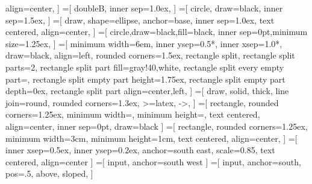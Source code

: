 	align=center,%
]%
=[%
	doubleB,%
	inner sep=1.0ex,%
]%
=[%
	circle,%
	draw=black,%
	inner sep=1.5ex,%
]%
=[%
	draw,%
	shape=ellipse,%
	anchor=base,%
	inner sep=1.0ex,%
	text centered,%
	align=center,%
]%
=[%
    circle,draw=black,fill=black,%
    inner sep=0pt,minimum size=1.25ex,%
]%
=[%
    minimum width=6em,%
    inner ysep=0.5*\inndist,%
    inner xsep=1.0*\inndist,%
    draw=black,%
    align=left,%
    rounded corners=1.5ex,%
    rectangle split,%
    rectangle split parts=2,%
    rectangle split part fill={gray!40,white},%
    rectangle split every empty part={},%
    rectangle split empty part height=1.75ex,%
    rectangle split empty part depth=0ex,%
    rectangle split part align={center,left},%
]%
=[%
    draw,%
    solid,%
    thick,%
    line join=round,%
    rounded corners=1.3ex,%
    >=latex,%
    ->,%
]%
%
%
%
\let\procwidth\undefined%
\newlength\procwidth%
\settowidth{\procwidth}{\textbf{Forwarding Path}}%
\setlength\procwidth{\procwidth+\inndist+\inndist+1em}%
\setlength\procwidth{6em}%
%
\let\procheight\undefined%
\newlength\procheight%
%
\setlength\procheight{1.75\baselineskip}%
%
\newcommand\roundcorneramount{1.25ex}%
=[%
	rectangle,%
	rounded corners=\roundcorneramount,%
	minimum width=\procwidth,%
	minimum height=\procheight,%
	text centered,%
	align=center,%
	inner sep=0pt,%
	draw=black%
]%
=[%
	rectangle,%
	rounded corners=\roundcorneramount,%
	minimum width=3cm,%
	minimum height=1cm,%
	text centered,%
	align=center,%
]%
=[%
	inner xsep=0.5ex,%
	inner ysep=0.2ex,%
    anchor=south east,%
    scale=0.85,%
	text centered,%
	align=center%
]%
=[%
    input,%
    anchor=south west%
]%
=[%
    input,%
    anchor=south,%
    pos=.5,%
    above,%
    sloped,%
]%
